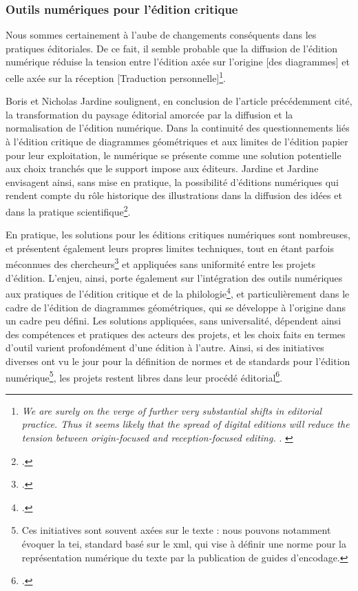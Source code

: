     \subsubsection{Outils numériques pour l'édition critique}
	\begin{displayquote}
		Nous sommes certainement à l'aube de changements conséquents dans les pratiques éditoriales. De ce fait, il semble probable que la diffusion de l'édition numérique réduise la tension entre l'édition axée sur l'origine [des diagrammes] et celle axée sur la réception [Traduction personnelle]\footnote{\textit{\og 			We are surely on the verge of further very substantial shifts in editorial practice. Thus it seems likely that the spread of digital editions will reduce the tension between origin-focused and reception-focused editing. \fg}. \cite{jardineCriticalEditingEarlyModern2010}}.
	\end{displayquote}
	
	Boris et Nicholas Jardine soulignent, en conclusion de l'article précédemment cité, la transformation du paysage éditorial amorcée par la diffusion et la normalisation de l'édition numérique. Dans la continuité des questionnements liés à l'édition critique de diagrammes géométriques et aux limites de l'édition papier pour leur exploitation, le numérique se présente comme une solution potentielle aux choix tranchés que le support impose aux éditeurs. Jardine et Jardine envisagent ainsi, sans mise en pratique, la possibilité d'éditions numériques qui rendent compte du rôle historique des illustrations dans la diffusion des idées et dans la pratique scientifique\footcite{jardineCriticalEditingEarlyModern2010}.
	
	En pratique, les solutions pour les éditions critiques numériques sont nombreuses, et présentent également leurs propres limites techniques, tout en étant parfois méconnues des chercheurs\footcite{apollonDigitalCriticalEditions2014} et appliquées sans uniformité entre les projets d'édition. L'enjeu, ainsi, porte également sur l'intégration des outils numériques aux pratiques de l'édition critique et de la philologie\footcite{apollonDigitalCriticalEditions2014}, et particulièrement dans le cadre de l'édition de diagrammes géométriques, qui se développe à l'origine dans un cadre peu défini. Les solutions appliquées, sans universalité, dépendent ainsi des compétences et pratiques des acteurs des projets, et les choix faits en termes d'outil varient profondément d'une édition à l'autre. Ainsi, si des initiatives diverses ont vu le jour pour la définition de normes et de standards pour l'édition numérique\footnote{Ces initiatives sont souvent axées sur le texte : nous pouvons notamment évoquer la \acrfull{tei}, standard basé sur le \acrshort{xml}, qui vise à définir une norme pour la représentation numérique du texte par la publication de guides d'encodage.}, les projets restent libres dans leur procédé éditorial\footcite{apollonDigitalCriticalEditions2014}.
	
